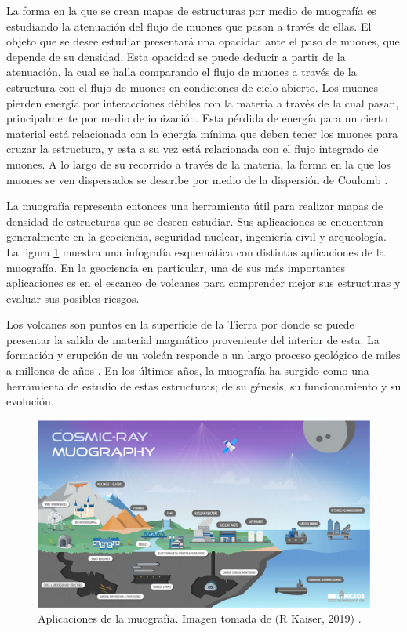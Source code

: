 \documentclass[12pt]{report}
\begin{document}
La forma en la que se crean mapas de estructuras por medio de muografía es estudiando la atenuación del flujo de muones que pasan a través de ellas. El objeto que se desee estudiar presentará una opacidad ante el paso de muones, que depende de su densidad. Esta opacidad se puede deducir a partir de la atenuación, la cual se halla comparando el flujo de muones a través de la estructura con el flujo de muones en condiciones de cielo abierto. Los muones pierden energía por interacciones débiles con la materia a través de la cual pasan, principalmente por medio de ionización. Esta pérdida de energía para un cierto material está relacionada con la energía mínima que deben tener los muones para cruzar la estructura, y esta a su vez está relacionada con el flujo integrado de muones. A lo largo de su recorrido a través de la materia, la forma en la que los muones se ven dispersados se describe por medio de la dispersión de Coulomb \cite{lesparre2010geophysical}.

La muografía representa entonces una herramienta útil para realizar mapas de densidad de estructuras que se deseen estudiar. Sus aplicaciones se encuentran generalmente en la geociencia, seguridad nuclear, ingeniería civil y arqueología. La figura \ref{fig:applications} muestra una infografía esquemática con distintas aplicaciones de la muografía. En la geociencia en particular, una de sus más importantes aplicaciones es en el escaneo de volcanes para comprender mejor sus estructuras y evaluar sus posibles riesgos.

Los volcanes son puntos en la superficie de la Tierra por donde se puede presentar la salida de material magmático proveniente del interior de esta. La formación y erupción de un volcán responde a un largo proceso geológico de miles a millones de años \cite{vesga2018inversion}. En los últimos años, la muografía ha surgido como una herramienta de estudio de estas estructuras; de su génesis, su funcionamiento y su evolución.

\begin{figure}
    \centering
    \includegraphics[width=\textwidth]{images/applications.png}
    \caption{Aplicaciones de la muografía. Imagen tomada de (R Kaiser, 2019) \cite{kaiser2019muography}.}
    \label{fig:applications}
\end{figure}
\end{document}
